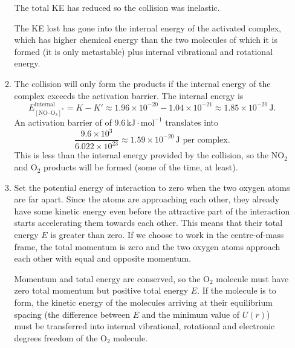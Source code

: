 \documentclass[12pt]{article}
\begin{document}
\begin{enumerate}
\begin{enumerate}
        The total KE has reduced so the collision was inelastic.

        The KE lost has gone into the internal energy of the activated
        complex, which has higher chemical energy than the two molecules
        of which it is formed (it is only metastable) plus internal
        vibrational and rotational energy.

      \item The collision will only form the products if the internal energy
        of the complex exceeds the activation barrier. The internal
        energy is
        \begin{displaymath}
          E^{\text{internal}}_{[\text{NO--O}_3]^{\ast}} = K - K' \approx
          1.96 \times 10^{-20} - 1.04 \times 10^{-21}
          \approx 1.85 \times 10^{-20}\,\text{J}.
        \end{displaymath}
        An activation barrier of of $9.6\,\text{kJ}\cdot\text{mol}^{-1}$
        translates into
        \begin{displaymath}
          \frac{9.6 \times 10^3}{6.022 \times 10^{23}} \approx 1.59 \times
          10^{-20} \, \text{J per complex}.
        \end{displaymath}
        This is less than the internal energy provided by the collision,
        so the NO$_2$ and O$_2$ products will be formed (some of the
        time, at least).

      \item Set the potential energy of interaction to zero when the two
        oxygen atoms are far apart. Since the atoms are approaching each
        other, they already have some kinetic energy even before the
        attractive part of the interaction starts accelerating them
        towards each other. This means that their total energy $E$ is
        greater than zero. If we choose to work in the centre-of-mass
        frame, the total momentum is zero and the two oxygen atoms
        approach each other with equal and opposite momentum.

        Momentum and total energy are conserved, so the O$_2$ molecule
        must have zero total momentum but positive total energy $E$. If
        the molecule is to form, the kinetic energy of the molecules
        arriving at their equilibrium spacing (the difference between
        $E$ and the minimum value of $U(r)$) must be transferred into
        internal vibrational, rotational and electronic degrees freedom
        of the O$_2$ molecule.


\end{enumerate}
\end{enumerate}
\end{document}
